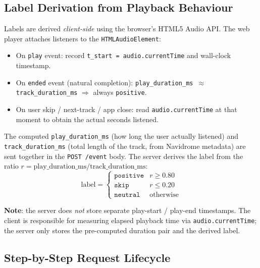 \documentclass[11pt]{article}
\newcommand{\note}[1]{\colorbox{noteblue}{\parbox{\dimexpr\linewidth-2\fboxsep}{\small #1}}}
\begin{document}
\subsection{Label Derivation from Playback Behaviour}

Labels are derived \emph{client-side} using the browser's HTML5 Audio API.
The web player attaches listeners to the \texttt{HTMLAudioElement}:

\begin{itemize}[leftmargin=1.5em]
  \item On \texttt{play} event: record \texttt{t\_start = audio.currentTime} and wall-clock
        timestamp.
  \item On \texttt{ended} event (natural completion): \texttt{play\_duration\_ms $\approx$
        track\_duration\_ms} $\Rightarrow$ always \texttt{positive}.
  \item On user skip / next-track / app close: read \texttt{audio.currentTime} at that moment
        to obtain the actual seconds listened.
\end{itemize}

The computed \texttt{play\_duration\_ms} (how long the user actually listened) and
\texttt{track\_duration\_ms} (total length of the track, from Navidrome metadata) are
sent together in the \texttt{POST /event} body.  The server derives the label from the ratio
$r = \text{play\_duration\_ms} / \text{track\_duration\_ms}$:
\[
  \text{label} =
  \begin{cases}
    \texttt{positive} & r \geq 0.80 \\
    \texttt{skip}     & r \leq 0.20 \\
    \texttt{neutral}  & \text{otherwise}
  \end{cases}
\]

\note{\textbf{Note}: the server does \emph{not} store separate play-start / play-end
timestamps.  The client is responsible for measuring elapsed playback time via
\texttt{audio.currentTime}; the server only stores the pre-computed duration pair
and the derived label.}

\subsection{Step-by-Step Request Lifecycle}
\end{document}

